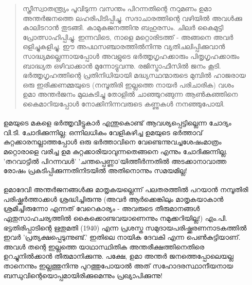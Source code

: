 \begin{quotation}
\noindent
സ്ത്രീസ്വാതന്ത്യ്രം പൂവിടുന്ന വസന്തം പിറന്നതിന്റെ നറുമണം ഉമാ അന്തർജനത്തെ ലഹരിപിടിപ്പിച്ചു. സദാചാരത്തിന്റെ വഴിയിൽ അവൾക്കു കാലിടറാൻ തുടങ്ങി. കാമുകജനത്തിനു ബഹുരസം. ചിലർ കൈമുട്ടി പ്രോത്സാഹിപ്പിച്ചു. ഇന്നവിടെ, നാളെ മറ്റൊരിടത്ത് - അങ്ങനെ അവർ ഒളിച്ചുകളിച്ചു. ഈ അപഥസഞ്ചാരത്തിൽനിന്നു വ്യതിചലിപ്പിക്കുവാൻ സാദ്ധ്യമല്ലെന്നായപ്പോൾ അവളുടെ ഭർത്തൃഗൃഹക്കാരും പിതൃഗൃഹക്കാരും ബാദ്ധ്യത ഒഴിവാക്കാൻ മുന്നോട്ടുവന്നു. രജിസ്ട്രാഫീസിൽ ജനം കൂടി. ഭർത്തൃഗൃഹത്തിന്റെ പ്രതിനിധിയായി മദ്ധ്യസ്ഥന്മാരുടെ മുമ്പിൽ ഹാജരായ ഒരു ഇരിക്കണമ്മയുടെ (നമ്പൂതിരി ഇല്ലത്തെ നായർ പരിചാരിക) വശം ഉമാ അന്തർജനം മുലകുടിച്ചു തോളിൽ ചാഞ്ഞുറങ്ങുന്ന ആൺകുഞ്ഞിനെ കൈമാറിയപ്പോൾ നോക്കിനിന്നവരുടെ കണ്ണുകൾ നനഞ്ഞുപോയി.
\end{quotation}

\paragraph{}ഉമയുടെ മകളെ ഭർത്തൃവീട്ടുകാർ എന്തുകൊണ്ട് ആവശ്യപ്പെട്ടില്ലെന്ന ചോദ്യം വി.ടി. ചോദിക്കുന്നില്ല; ഒന്നിലധികം വേളികഴിച്ച ഉമയുടെ ഭർത്താവ് കുറ്റക്കാരനല്ലാത്തപ്പോൾ ഒരു ഭർത്താവിനെ വേണ്ടെന്നുവച്ചശേഷംമാത്രം മറ്റൊരാളെ വരിച്ച ഉമ കുറ്റക്കാരിയാവുന്നതെങ്ങനെ എന്നും ചോദിക്കുന്നില്ല. 'തറവാട്ടിൽ പിറന്നവൾ' 'ചന്തപ്പെണ്ണാ'യിത്തീർന്നതിൽ അടക്കാനാവാത്ത രോഷം പ്രകടിപ്പിക്കുന്നതിനിടയിൽ അതിനൊന്നും സമയമില്ല!

\paragraph{}ഉമാദേവി അന്തർജനങ്ങൾക്കു മാതൃകയല്ലെന്ന് പലതരത്തിൽ പറയാൻ നമ്പൂതിരി പരിഷ്ക്കർത്താക്കൾ ശ്രദ്ധിച്ചിരുന്നു (അവർ ആർക്കെങ്കിലും മാതൃകയാകാൻ ശ്രമിച്ചിരുന്നോ എന്നത് വേറെകാര്യം - അവരുടെ തീരുമാനങ്ങൾ ഏതുസാഹചര്യത്തിൽ കൈക്കൊണ്ടവയാണെന്നും നമുക്കറിയില്ല!) എം.പി. ഭട്ടതിരിപ്പാടിന്റെ ഋതുമതി (1940) എന്ന പ്രശസ്ത സമുദായപരിഷ്ക്കരണനാടകത്തിൽ ഇവർ 'പ്രത്യക്ഷപ്പെടുന്നുണ്ട്.' ഇതിലെ നായിക ദേവകി എന്ന പെൺകുട്ടിയാണ്. അവൾ തന്റെ ഇല്ലത്തെ യാഥാസ്ഥിതിക അന്തരീക്ഷത്തിനെതിരെ ഉറച്ചുനിൽക്കാൻ തീരുമാനിക്കുന്നു. പക്ഷേ, ഉമാ അന്തർ ജനത്തെപ്പോലെയല്ല താനെന്നും ഇല്ലത്തുനിന്നു പുറത്തുപോയാൽ അത് സഹോദരസ്ഥാനീയനായ ബന്ധുവിന്റെയൊപ്പമായിരിക്കുമെന്നും പ്രഖ്യാപിക്കുന്നു!

